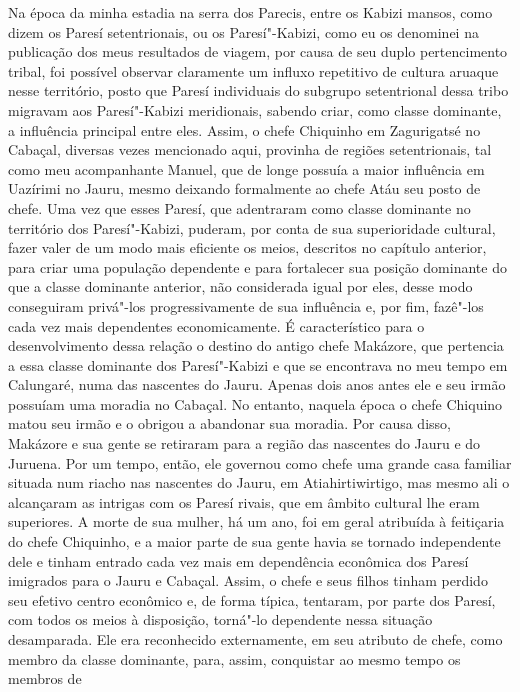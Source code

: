 Na época da minha estadia na serra dos Parecis, entre os Kabizi mansos,
como dizem os Paresí setentrionais, ou os Paresí"-Kabizi, como eu os
denominei na publicação dos meus resultados de viagem, por causa de seu
duplo pertencimento tribal, foi possível observar claramente um influxo
repetitivo de cultura aruaque nesse território, posto que Paresí
individuais do subgrupo setentrional dessa tribo migravam aos
Paresí"-Kabizi meridionais, sabendo criar, como classe dominante, a
influência principal entre eles. Assim, o chefe Chiquinho em Zagurigatsé
no Cabaçal, diversas vezes mencionado aqui, provinha de regiões
setentrionais, tal como meu acompanhante Manuel, que de longe possuía a
maior influência em Uazírimi no Jauru, mesmo deixando formalmente ao
chefe Atáu seu posto de chefe. Uma vez que esses Paresí, que adentraram
como classe dominante no território dos Paresí"-Kabizi, puderam, por
conta de sua superioridade cultural, fazer valer de um modo mais
eficiente os meios, descritos no capítulo anterior, para criar uma
população dependente e para fortalecer sua posição dominante do que a
classe dominante anterior, não considerada igual por eles, desse modo
conseguiram privá"-los progressivamente de sua influência e, por fim,
fazê"-los cada vez mais dependentes economicamente. É característico para
o desenvolvimento dessa relação o destino do antigo chefe Makázore, que
pertencia a essa classe dominante dos Paresí"-Kabizi e que se encontrava
no meu tempo em Calungaré, numa das nascentes do Jauru. Apenas dois
anos antes ele e seu irmão possuíam uma moradia no Cabaçal. No entanto,
naquela época o chefe Chiquino matou seu irmão e o obrigou a abandonar
sua moradia. Por causa disso, Makázore e sua gente se retiraram para a
região das nascentes do Jauru e do Juruena. Por um tempo, então, ele
governou como chefe uma grande casa familiar situada num riacho nas
nascentes do Jauru, em Atiahirtiwirtigo, mas mesmo ali o alcançaram as
intrigas com os Paresí rivais, que em âmbito cultural lhe eram
superiores. A morte de sua mulher, há um ano, foi em geral atribuída à
feitiçaria do chefe Chiquinho, e a maior parte de sua gente havia se
tornado independente dele e tinham entrado cada vez mais em dependência
econômica dos Paresí imigrados para o Jauru e Cabaçal. Assim, o chefe e
seus filhos tinham perdido seu efetivo centro econômico e, de forma
típica, tentaram, por parte dos Paresí, com todos os meios à
disposição, torná"-lo dependente nessa situação desamparada. Ele era
reconhecido externamente, em seu atributo de chefe, como membro da
classe dominante, para, assim, conquistar ao mesmo tempo os membros de
